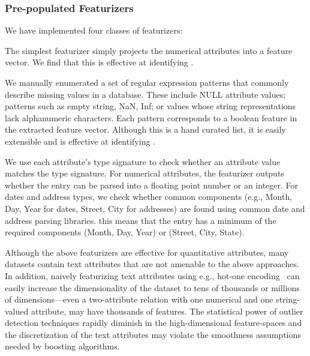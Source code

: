 \subsubsection{Pre-populated Featurizers}

We have implemented four classes of featurizers:


 The simplest featurizer simply projects the numerical attributes into a feature vector.  We find that this is effective at identifying .

  We manually enumerated a set of regular expression patterns that commonly describe missing values in a database.  These include \textsf{NULL} attribute values; patterns such as empty string, NaN, Inf; or values whose string representations lack alphanumeric characters. Each pattern corresponds to a boolean feature in the extracted feature vector.   Although this is a hand curated list, it is easily extensible and is effective at identifying .

 We use each attribute's type signature to check whether an attribute value matches the type signature.  For numerical attributes, the featurizer outputs whether the entry can be parsed into a floating point number or an integer. For dates and address types, we check whether common components (e.g., Month, Day, Year for dates, Street, City for addresses) are found using common date and address parsing libraries.   this means that the entry has a minimum of the required components (Month, Day, Year) or (Street, City, State). 


Although the above featurizers are effective for quantitative attributes, many datasets contain text attributes that are not amenable to the above approaches.  In addition, naively featurizing text attributes using e.g., hot-one encoding~\cite{} can easily increase the dimensionality of the dataset to tens of thousands or millions of dimensions---even a two-attribute relation with one numerical and one string-valued attribute, may have thousands of features.  The statistical power of outlier detection techniques rapidly diminish in the high-dimensional feature-spaces and the discretization of the text attributes may violate the smoothness assumptions needed by boosting algorithms.

